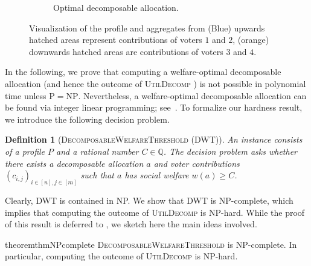 \documentclass[11pt]{article}
\newcommand{\UtDec}{\textsc{UtilDecomp} }
\newtheorem{definition}{Definition}
\begin{document}
\begin{figure}
\begin{subfigure}[t]{.49\textwidth}
        \caption{Optimal decomposable allocation.} \label{fig:greedydecomp_social_welfare_small_opt}
    \end{subfigure}
    \caption{Visualization of the profile and aggregates from  (Blue) upwards hatched areas represent contributions of voters $1$ and $2$, (orange) downwards hatched areas are contributions of voters $3$ and $4$.}
    \label{fig:greedydecomp_social_welfare_small}
\end{figure}



{%
In the following, we prove that computing a welfare-optimal decomposable allocation (and hence the outcome of \UtDec) is not possible in polynomial time unless $\mathrm{P}=\mathrm{NP}$. Nevertheless, a welfare-optimal decomposable allocation can be found via integer linear programming; see~. To formalize our hardness result, we introduce the following decision problem.}







\begin{definition}[\textsc{DecomposableWelfareThreshold (DWT)}]
An instance consists of a profile $P$ and a rational number $C \in \mathbb{Q}$. The decision problem asks whether there exists a decomposable allocation $a$ and voter contributions $(c_{i,j})_{i \in [n], j \in [m]}$ such that $a$ has social welfare $w(a) \ge C$.
\end{definition}

Clearly, \textsc{DWT} is contained in NP. We show that \textsc{DWT} is NP-complete, which implies that computing the outcome of \UtDec is NP-hard. While the proof of this result is deferred to , we sketch here the main ideas involved.



\begin{restatable}{theorem}{thmNPcomplete}
\label{thm:welfare-optimal-decomposable-hardness}
    \textsc{DecomposableWelfareThreshold} is NP-complete.
    In particular, computing the outcome of \UtDec is NP-hard.
\end{restatable}
\end{document}
